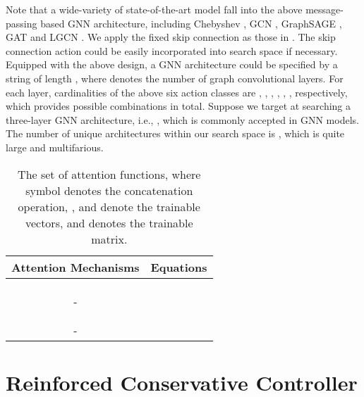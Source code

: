 \documentclass[sigconf]{acmart}
\begin{document}
Note that a wide-variety of state-of-the-art model fall into the above message-passing based GNN architecture, including Chebyshev \cite{defferrard2016convolutional}, GCN \cite{kipf2016semi}, GraphSAGE \cite{hamilton2017inductive}, GAT \cite{velickovic2017graph} and LGCN \cite{gao2018large}. We apply the fixed skip connection as those in \cite{kipf2016semi, velickovic2017graph}. The skip connection action could be easily incorporated into search space if necessary. Equipped with the above design, a GNN architecture could be specified by a string of length , where  denotes the number of graph convolutional layers. For each layer, cardinalities of the above six action classes are , , , , , , respectively, which provides  possible combinations in total. Suppose we target at searching a three-layer GNN architecture, i.e., , which is commonly accepted in GNN models. The number of unique 
architectures within our search space is , which is quite large and multifarious.








\begin{table}
\centering
\caption{The set of attention functions, where symbol  denotes the concatenation operation, ,  and  denote the trainable vectors, and  denotes the trainable matrix. }
\label{Tab: attention}
\begin{tabular}{c|c}
\toprule
   Attention Mechanisms &  Equations \\
   \hline
   \hline
    &  \\ \hline
    &  \\ \hline
    &  \\ \hline
   - &   \\  \hline
    &  \\ \hline
    &  \\ \hline
   - &  \\
\bottomrule
\end{tabular}
\end{table}

\section{Reinforced Conservative Controller}
\end{document}
